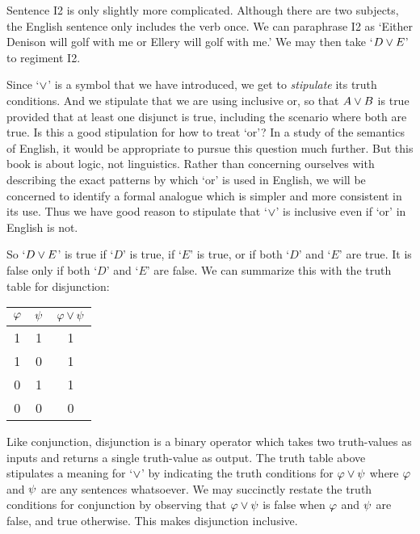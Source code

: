 Sentence I2 is only slightly more complicated.
Although there are two subjects, the English sentence only includes the verb once.
We can paraphrase I2 as `Either Denison will golf with me or Ellery will golf with me.'
We may then take `$D \vee E$' to regiment I2.


Since `$\vee$' is a symbol that we have introduced, we get to \textit{stipulate} its truth conditions.
And we stipulate that we are using inclusive or, so that $A \vee B$ is true provided that at least one disjunct is true, including the scenario where both are true.
Is this a good stipulation for how to treat `or'?
In a study of the semantics of English, it would be appropriate to pursue this question much further.
But this book is about logic, not linguistics.
Rather than concerning ourselves with describing the exact patterns by which `or' is used in English, we will be concerned to identify a formal analogue which is simpler and more consistent in its use.
Thus we have good reason to stipulate that `$\vee$' is inclusive even if `or' in English is not. 

So `$D \vee E$' is true if `$D$' is true, if `$E$' is true, or if both `$D$' and `$E$' are true.
It is false only if both `$D$' and `$E$' are false.
We can summarize this with the truth table for disjunction:

\begin{center}
\begin{tabular}{c|c|c}
$\varphi$ & $\psi$ & $\varphi\vee\psi$ \\
\hline
1 & 1 & 1\\
1 & 0 & 1\\
0 & 1 & 1\\
0 & 0 & 0
\end{tabular}
\end{center}

Like conjunction, disjunction is a binary operator which takes two truth-values as inputs and returns a single truth-value as output.
The truth table above stipulates a meaning for `$\vee$' by indicating the truth conditions for $\varphi \vee \psi$ where $\varphi$ and $\psi$ are any sentences whatsoever.
We may succinctly restate the truth conditions for conjunction by observing that $\varphi\vee \psi$ is false when $\varphi$ and $\psi$ are false, and true otherwise.
This makes disjunction inclusive.

